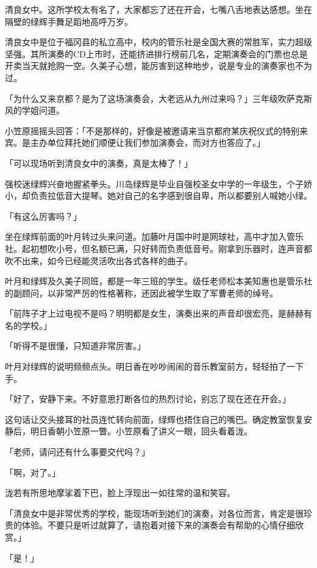 \documentclass[UTF8]{ctexart}
\begin{document}
    清良女中。这所学校太有名了，大家都忘了还在开会，七嘴八舌地表达感想。坐在隔壁的绿辉手舞足蹈地高呼万岁。 

    清良女中是位于福冈县的私立高中，校内的管乐社是全国大赛的常胜军，实力超级坚强。其所演奏的CD上市时，还能挤进排行榜前几名，定期演奏会的门票也总是开卖当天就抢购一空。久美子心想，能厉害到这种地步，说是专业的演奏家也不为过。 

    「为什么又来京都？是为了这场演奏会，大老远从九州过来吗？」三年级吹萨克斯风的学姐问道。 

    小笠原摇摇头回答：「不是那样的，好像是被邀请来当京都府某庆祝仪式的特别来宾。是主办单位拜托她们顺便让我们参加演奏会，而对方也答应了。」 

    「可以现场听到清良女中的演奏，真是太棒了！」 

    强校迷绿辉兴奋地握紧拳头。川岛绿辉是毕业自强校圣女中学的一年级生，个子娇小，却负责拉低音大提琴。她对自己的名字感到很自卑，所以都要别人喊她小绿。 

    「有这么厉害吗？」 

    坐在绿辉前面的叶月转过头来问道。加藤叶月国中时是网球社，高中才加入管乐社。起初想吹小号，但名额已满，只好转而负责低音号。刚拿到乐器时，连声音都吹不出来，如今已经能灵活吹出各式各样的曲子。 

    叶月和绿辉及久美子同班，都是一年三班的学生。级任老师松本美知惠也是管乐社的副顾问，以非常严厉的性格著称，还因此被学生取了军曹老师的绰号。 

    「前阵子才上过电视不是吗？明明都是女生，演奏出来的声音却很宏亮，是赫赫有名的学校。」 

    「听得不是很懂，只知道非常厉害。」 

    叶月对绿辉的说明频频点头。明日香在吵吵闹闹的音乐教室前方，轻轻拍了一下手。 

    「好了，安静下来。不好意思打断各位的热烈讨论，别忘了现在还在开会。」 

    这句话让交头接耳的社员连忙转向前面，绿辉也捂住自己的嘴巴。确定教室恢复安静后，明日香朝小笠原一瞥。小笠原看了讲义一眼，回头看着泷。 

    「老师，请问还有什么事要交代吗？」 

    「啊，对了。」 

    泷若有所思地摩挲着下巴，脸上浮现出一如往常的温和笑容。 

    「清良女中是非常优秀的学校，能现场听到她们的演奏，对各位而言，肯定是很珍贵的体验。不要只是听过就算了，请抱着对接下来的演奏会有帮助的心情仔细欣赏。」 

    「是！」 
\end{document}
